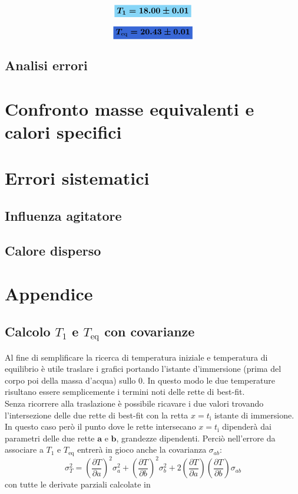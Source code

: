 \documentclass{article}
\newcommand{\azzurro}[1]{\colorbox{mylightblue}{$\displaystyle #1$}}
\newcommand{\blu}[1]{\colorbox{myblue}{$\displaystyle #1$}}
\begin{document}
	\begin{minipage}{\textwidth}
		\[ 
		\azzurro{\boldsymbol{T_{1} = 18.00 \pm	0.01} }
		\]
	\end{minipage}
	\begin{minipage}{\textwidth}
		\[ 
		\blu{\boldsymbol{T_{\text{eq}} = 20.43 \pm 0.01} }
		\]
	\end{minipage}
	
	
	
	
	\subsection{Analisi errori}
	
	\newpage
	\section{Confronto masse equivalenti e calori specifici}
	
	\newpage
	\section{Errori sistematici}
	\subsection{Influenza agitatore}
	\subsection{Calore disperso}
	
	\newpage
	\section{Appendice}
	\subsection{Calcolo \(T_{1}\) e \(T_{\text{eq}}\) con covarianze} \label{covarianza}
	Al fine di semplificare la ricerca di temperatura iniziale e temperatura di equilibrio è utile traslare i grafici portando l'istante d'immersione (prima del corpo poi della massa d'acqua) sullo \(0\). In questo modo le due temperature risultano essere semplicemente i termini noti delle rette di best-fit. \\
	
	Senza ricorrere alla traslazione è possibile ricavare i due valori trovando l'intersezione delle due rette di best-fit con la retta \(x=t_{\text{i}}\) istante di immersione. In questo caso però il punto dove le rette intersecano \(x=t_{\text{i}}\) dipenderà dai parametri delle due rette  \(\boldsymbol{a}\) e \(\boldsymbol{b}\), grandezze dipendenti. Perciò nell'errore da associare a \(T_{1}\) e \(T_{\text{eq}}\) entrerà in gioco anche la covarianza \(\sigma_{ab}\):
	\[ 
	\sigma_T^2 = \left(\frac{\partial T}{\partial a}\right)^2 \sigma_a^2 + \left(\frac{\partial T}{\partial b}\right)^2 \sigma_b^2 + 2\left(\frac{\partial T}{\partial a}\right)\left(\frac{\partial T}{\partial b}\right) \sigma_{ab}
	\]
	con tutte le derivate parziali calcolate in 
	
\end{document}
